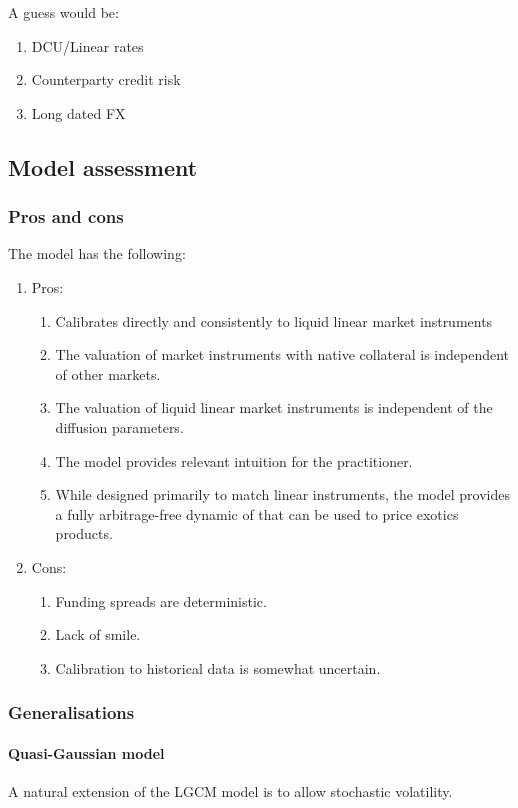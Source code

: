 \documentclass[11pt,english]{amsart}
\theoremstyle{definition}
\begin{document}
A guess would be:
\begin{enumerate}
\item DCU/Linear rates
\item Counterparty credit risk
\item Long dated FX
\end{enumerate}



\subsection{Model assessment}


\subsubsection{Pros and cons}
The model has the following:
\begin{enumerate}
\item Pros:
\begin{enumerate}
\item Calibrates directly and consistently to liquid linear market instruments
\item The valuation of market instruments with native collateral is independent of other markets.
\item The valuation of liquid linear market instruments is independent of the diffusion parameters.
\item The model provides relevant intuition for the practitioner.
\item While designed primarily to match linear instruments, the model provides a fully arbitrage-free dynamic of that can be used to price exotics products. 
\end{enumerate}
\item Cons:
\begin{enumerate}
\item Funding spreads are deterministic.
\item Lack of smile.
\item Calibration to historical data is somewhat uncertain.
\end{enumerate}
\end{enumerate}

\subsubsection{Generalisations}%

\paragraph{Quasi-Gaussian model}%
A natural extension of the LGCM model is to allow stochastic volatility. 
\end{document}
